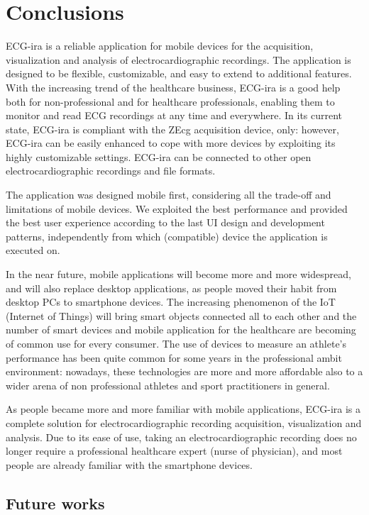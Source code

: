 
\chapter{Conclusions}\label{Chapter11}

ECG-ira is a reliable application for mobile devices for the acquisition, visualization and analysis of electrocardiographic recordings. The application is designed to be flexible, customizable, and easy to extend to additional features. With the increasing trend of the healthcare business, ECG-ira is a good help both for non-professional and for healthcare professionals, enabling them to monitor and read ECG recordings at any time and everywhere. In its current state, ECG-ira is compliant with the ZEcg acquisition device, only: however, ECG-ira can be easily enhanced to cope with more devices by exploiting its highly customizable settings. ECG-ira can be connected to other open electrocardiographic recordings and file formats.

The application was designed mobile first, considering all the trade-off and limitations of mobile devices. We exploited the best performance and provided the best user experience according to the last UI design and development patterns, independently from which (compatible) device the application is executed on.

In the near future, mobile applications will become more and more widespread, and will also replace desktop applications, as people moved their habit from desktop PCs to smartphone devices. The increasing phenomenon of the IoT (Internet of Things) will bring smart objects connected all to each other and the number of smart devices and mobile application for the healthcare are becoming of common use for every consumer. The use of devices to measure an athlete's performance has been quite common for some years in the professional ambit environment: nowadays, these technologies are more and more affordable also to a wider arena of non professional athletes and sport practitioners in general.

As people became more and more familiar with mobile applications, ECG-ira is a complete solution for electrocardiographic recording acquisition, visualization and analysis. Due to its ease of use, taking an electrocardiographic recording does no longer require a professional healthcare expert (nurse of physician), and most people are already familiar with the smartphone devices.


\section{Future works}

